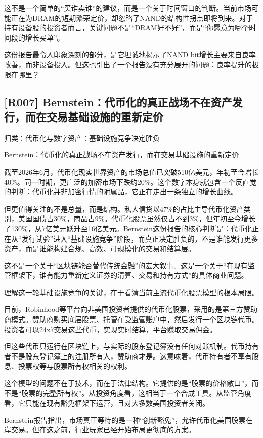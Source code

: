 \documentclass[11pt]{ctexart}
\begin{document}
这不是一个简单的“买谁卖谁”的建议，而是一个关于时间窗口的判断。当前市场可能正在为DRAM的短期繁荣定价，却忽略了NAND的结构性拐点即将到来。对于持有设备股的投资者而言，关键问题不是“DRAM好不好”，而是“你愿意为哪个时间段的增长买单”。

这份报告最令人印象深刻的部分，是它坦诚地揭示了NAND bit增长主要来自良率改善，而非设备投入。但这也引出了一个报告没有充分展开的问题：良率提升的极限在哪里？

\subsection{[R007] Bernstein：代币化的真正战场不在资产发行，而在交易基础设施的重新定价}
{\small\color{refgray}归类：代币化与数字资产：基础设施竞争决定胜负}

Bernstein：代币化的真正战场不在资产发行，而在交易基础设施的重新定价

截至2026年6月，代币化现实世界资产的市场总值已突破510亿美元，年初至今增长40\%。同一时期，更广泛的加密市场下跌约20\%。这个数字本身就包含一个反直觉的判断：代币化并非加密行情的附属品，它正在走出一条独立的增长曲线。

但更值得关注的不是总量，而是结构。私人信贷以47\%的占比主导代币化资产类别，美国国债占30\%，商品占9\%。代币化股票虽然仅占不到3\%，但年初至今增长了130\%，从7亿美元跃升至16亿美元。Bernstein这份报告的核心判断是：代币化正在从“发行试验”进入“基础设施竞争”阶段，而真正决定胜负的，不是谁能发行更多资产，而是谁能构建合规、高效、可规模化的交易和结算层。

这不是一个关于“区块链能否替代传统金融”的宏大叙事。这是一个关于“在现有监管框架下，谁有能力重新定义证券的清算、交易和持有方式”的具体商业问题。

理解这一轮基础设施竞争的关键，在于看清当前主流代币化股票模型的根本局限。

目前，Robinhood等平台向非美国投资者提供的代币化股票，采用的是第三方赞助商模式。赞助商购买底层股票、托管在受监管账户中，然后发行一个区块链代币。投资者可以24x7交易这些代币，实现实时结算，平台赚取交易佣金。

但这些代币只运行在区块链上，与实际的股东登记簿没有任何对账机制。代币持有者不是股东登记簿上的注册所有人，赞助商才是。这意味着，代币持有者不享有股息、投票权等与股票所有权相关的权利。

这个模型的问题不在于技术，而在于法律结构。它提供的是“股票的价格敞口”，而不是“股票的完整所有权”。从投资角度看，这相当于一个合成工具。从监管角度看，它只能在现有豁免框架下运营，且对大多数美国投资者关闭。

Bernstein报告指出，市场真正等待的是一种“创新豁免”，允许代币化美国股票在岸交易。但在这之前，行业玩家已经开始布局更彻底的方案。
\end{document}
